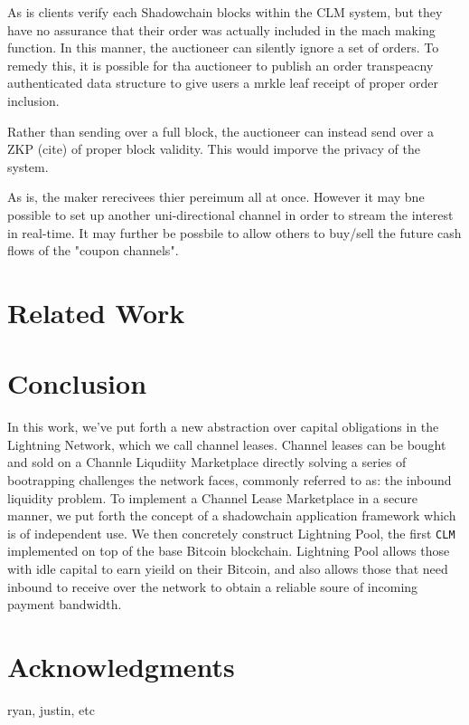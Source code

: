 \documentclass[10pt,a4paper]{article}
\theoremstyle{definition}
\begin{document}
As is clients verify each Shadowchain blocks within the CLM system, but they
have no assurance that their order was actually included in the mach making
function. In this manner, the auctioneer can silently ignore a set of orders.
To remedy this, it is possible for tha auctioneer to publish an order
transpeacny authenticated data structure to give users a mrkle leaf receipt of
proper order inclusion.

Rather than sending over a full block, the auctioneer can instead send over a
ZKP (cite) of proper block validity. This would imporve the privacy of the
system.

As is, the maker rerecivees thier pereimum all at once. However it may bne
possible to set up another uni-directional channel in order to stream the
interest in real-time. It may further be possbile to allow others to buy/sell
the future cash flows of the "coupon channels".

\section{Related Work}

\section{Conclusion}

In this work, we've put forth a new abstraction over capital obligations in the
Lightning Network, which we call channel leases. Channel leases can be bought
and sold on a Channle Liqudiity Marketplace directly solving a series of
bootrapping challenges the network faces, commonly referred to as: the inbound
liquidity problem. To implement a Channel Lease Marketplace in a secure manner,
we put forth the concept of a shadowchain application framework which is of
independent use. We then concretely construct Lightning Pool, the first
\texttt{CLM} implemented on top of the base Bitcoin blockchain. Lightning Pool
allows those with idle capital to earn yieild on their Bitcoin, and also allows
those that need inbound to receive over the network to obtain a reliable soure
of incoming payment bandwidth.

\section{Acknowledgments}

ryan, justin, etc



\end{document}
